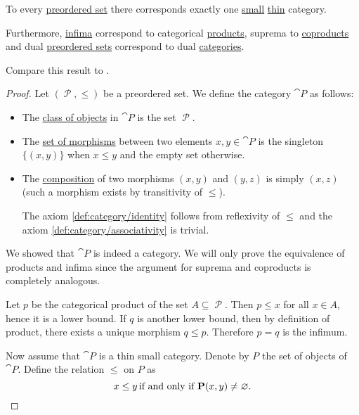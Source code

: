 \begin{proposition}\label{thm:preorder_category_correspondence}
  To every \hyperref[def:preordered_set]{preordered set} there corresponds exactly one \hyperref[def:small_and_large_categories]{small} \hyperref[def:thin_category]{thin} category.

  Furthermore, \hyperref[def:poset_extremal_points/supremum_and_infimum]{infima} correspond to categorical \hyperref[def:categorical_product]{products}, suprema to \hyperref[def:categorical_coproduct]{coproducts} and dual \hyperref[def:preordered_set/duality]{preordered sets} correspond to dual \hyperref[def:opposite_category]{categories}.

  Compare this result to .
\end{proposition}
\begin{proof}
  \SufficiencySubProof Let \( (\mscrP, \leq) \) be a preordered set. We define the category \( \cat{P} \) as follows:
  \begin{itemize}
    \item The \hyperref[def:category/C1]{class of objects} in \( \cat{P} \) is the set \( \mscrP \).
    \item The \hyperref[def:category/C2]{set of morphisms} between two elements \( x, y \in \cat{P} \) is the singleton \( \{ (x, y) \} \) when \( x \leq y \) and the empty set otherwise.
    \item The \hyperref[def:category/C3]{composition} of two morphisms \( (x, y) \) and \( (y, z) \) is simply \( (x, z) \) (such a morphism exists by transitivity of \( \leq \)).

    The axiom \ref{def:category/identity} follows from reflexivity of \( \leq \) and the axiom \ref{def:category/associativity} is trivial.
  \end{itemize}

  We showed that \( \cat{P} \) is indeed a category. We will only prove the equivalence of products and infima since the argument for suprema and coproducts is completely analogous.

  Let \( p \) be the categorical product of the set \( A \subseteq \mscrP \). Then \( p \leq x \) for all \( x \in A \), hence it is a lower bound. If \( q \) is another lower bound, then by definition of product, there exists a unique morphism \( q \leq p \). Therefore \( p = q \) is the infimum.

  \NecessitySubProof Now assume that \( \cat{P} \) is a thin small category. Denote by \( P \) the set of objects of \( \cat{P} \). Define the relation \( \leq \) on \( P \) as
  \begin{equation*}
    x \leq y \T{if and only if} \cat{P}(x, y) \neq \varnothing.
  \end{equation*}


\end{proof}
